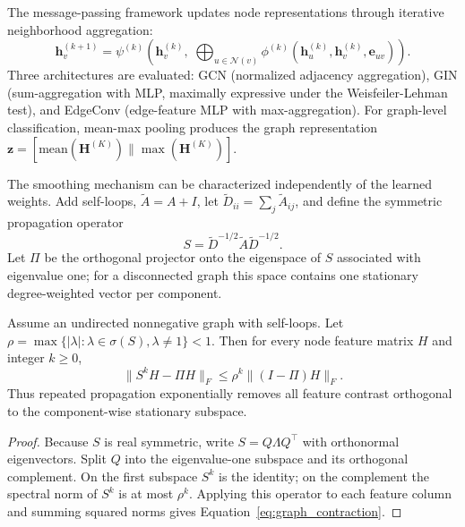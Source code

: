 The message-passing framework \cite{Gilmer2017} updates node representations through iterative neighborhood aggregation:
\begin{equation}
    \mathbf{h}_v^{(k+1)} = \psi^{(k)}\!\left(\mathbf{h}_v^{(k)},\; \bigoplus_{u \in \mathcal{N}(v)} \phi^{(k)}\!\left(\mathbf{h}_u^{(k)}, \mathbf{h}_v^{(k)}, \mathbf{e}_{uv}\right)\right).
\end{equation}
Three architectures are evaluated: GCN \cite{Kipf2017} (normalized adjacency aggregation), GIN \cite{Xu2019} (sum-aggregation with MLP, maximally expressive under the Weisfeiler-Lehman test), and EdgeConv \cite{Wang2019HeterogeneousGNN} (edge-feature MLP with max-aggregation). For graph-level classification, mean-max pooling produces the graph representation $\mathbf{z} = [\text{mean}(\mathbf{H}^{(K)}) \| \max(\mathbf{H}^{(K)})]$.

The smoothing mechanism can be characterized independently of the learned
weights. Add self-loops, $\widetilde A=A+I$, let
$\widetilde D_{ii}=\sum_j\widetilde A_{ij}$, and define the symmetric propagation
operator
\begin{equation}
S=\widetilde D^{-1/2}\widetilde A\widetilde D^{-1/2}.
\end{equation}
Let $\Pi$ be the orthogonal projector onto the eigenspace of $S$ associated with
eigenvalue one; for a disconnected graph this space contains one stationary
degree-weighted vector per component.

\begin{theorem}
\label{thm:graph_smoothing}
Assume an undirected nonnegative graph with self-loops. Let
$\rho=\max\{|\lambda|:\lambda\in\sigma(S),\lambda\ne1\}<1$. Then for every node
feature matrix $H$ and integer $k\ge0$,
\begin{equation}
\|S^kH-\Pi H\|_F\le \rho^k\|(I-\Pi)H\|_F.
\label{eq:graph_contraction}
\end{equation}
Thus repeated propagation exponentially removes all feature contrast orthogonal
to the component-wise stationary subspace.
\end{theorem}

\begin{proof}
Because $S$ is real symmetric, write $S=Q\Lambda Q^\top$ with orthonormal
eigenvectors. Split $Q$ into the eigenvalue-one subspace and its orthogonal
complement. On the first subspace $S^k$ is the identity; on the complement the
spectral norm of $S^k$ is at most $\rho^k$. Applying this operator to each feature
column and summing squared norms gives Equation~\eqref{eq:graph_contraction}.
\end{proof}

